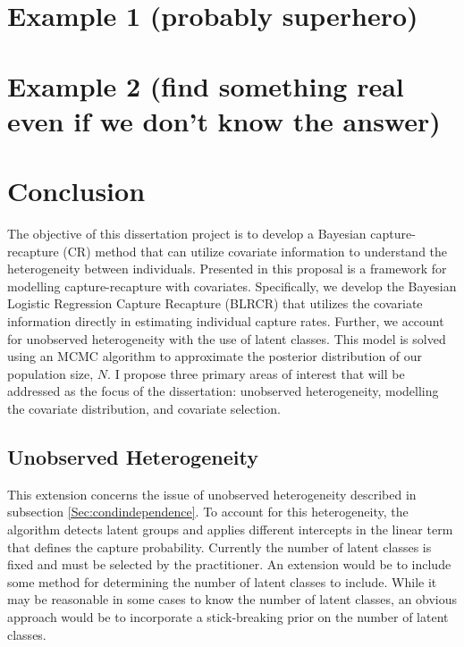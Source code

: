 \documentclass[
  12pt,
]{article}
\begin{document}
\newpage
\section{Example 1 (probably superhero)}
\label{Sec:example1}

\newpage
\section{Example 2 (find something real even if we don't know the answer)}
\label{Sec:example2}

\newpage

\section{Conclusion}
\label{Sec:Conclusion}

The objective of this dissertation project is to develop a Bayesian
capture-recapture (CR) method that can utilize covariate information to
understand the heterogeneity between individuals. Presented in this
proposal is a framework for modelling capture-recapture with covariates.
Specifically, we develop the Bayesian Logistic Regression Capture
Recapture (BLRCR) that utilizes the covariate information directly in
estimating individual capture rates. Further, we account for unobserved
heterogeneity with the use of latent classes. This model is solved using
an MCMC algorithm to approximate the posterior distribution of our
population size, \(N\). I propose three primary areas of interest that
will be addressed as the focus of the dissertation: unobserved
heterogeneity, modelling the covariate distribution, and covariate
selection.

\subsection{Unobserved Heterogeneity}

This extension concerns the issue of unobserved heterogeneity described
in subsection \ref{Sec:condindependence}. To account for this
heterogeneity, the algorithm detects latent groups and applies different
intercepts in the linear term that defines the capture probability.
Currently the number of latent classes is fixed and must be selected by
the practitioner. An extension would be to include some method for
determining the number of latent classes to include. While it may be
reasonable in some cases to know the number of latent classes, an
obvious approach would be to incorporate a stick-breaking prior on the
number of latent classes.
\end{document}
